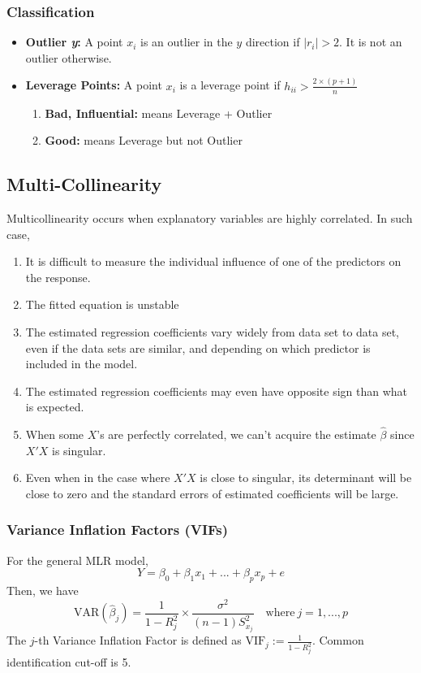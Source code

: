 \documentclass[10pt]{article}
\begin{document}
\subsubsection{Classification}
\begin{itemize}
    \item \textbf{Outlier \textit{y}:} A point $x_i$ is an outlier in the $y$ direction if $|r_i| > 2$. It is not an outlier otherwise.
    \item \textbf{Leverage Points:} A point $x_i$ is a leverage point if $h_{ii} > \frac{2\times (p+1)}{n}$
        \begin{enumerate}
            \item \textbf{Bad, Influential:} means Leverage + Outlier
            \item \textbf{Good:} means Leverage but not Outlier
        \end{enumerate}
\end{itemize}

\color{BurntOrange}
\subsection{Multi-Collinearity}
\color{Black}
Multicollinearity occurs when explanatory variables are highly correlated. In such case,
\begin{enumerate}
    \item It is difficult to measure the individual influence of one of the predictors on the response. 
    \item The fitted equation is unstable
    \item The estimated regression coefficients vary widely from data set to data set, even if the data sets are similar, and depending on which predictor is included in the model.
    \item The estimated regression coefficients may even have opposite sign than what is expected. 
    \item When some $X$'s are perfectly correlated, we can't acquire the estimate $\hat{\beta}$ since $X'X$ is singular. 
    \item Even when in the case where $X'X$ is close to singular, its determinant will be close to zero and the standard errors of estimated coefficients will be large. 
\end{enumerate}
\subsubsection{Variance Inflation Factors (VIFs)}
For the general MLR model, 
\begin{equation*}
    Y = \beta_0 + \beta_1 x_1 +... + \beta_p x_p + e
\end{equation*}
Then, we have
\begin{equation*}
    \mathrm{VAR}(\hat{\beta}_j) = \frac{1}{1 - R_j^2} \times \frac{\sigma^2}{(n - 1)S_{x_j}^2} \quad \text{where} ~j = 1,...,p
\end{equation*}
The $j$-th Variance Inflation Factor is defined as $\mathrm{VIF}_j := \frac{1}{1 - R_j^2}$. Common identification cut-off is 5. 
\end{document}
